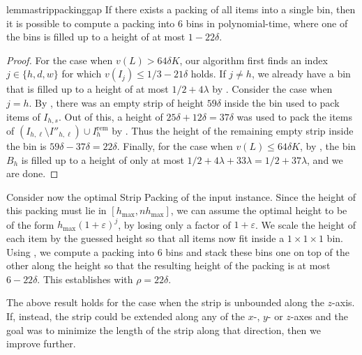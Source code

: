 \documentclass[a4paper,UKenglish,cleveref, autoref, thm-restate]{lipics-v2021}
\renewcommand{\epsilon}{\lambda}
\begin{document}
\begin{restatable}{lemma}{strippackinggap}
\label{lem:strippackinggap}
    If there exists a packing of all items into a single bin, then it is possible to compute a packing into 6 bins in polynomial-time, where one of the bins is filled up to a height of at most $1-22\delta$.
\end{restatable}
\begin{proof}
    For the case when $v(L)>64\delta K$, our algorithm first finds an index $j \in \{h,d,w\}$ for which $v(I_j)\le 1/3-21\delta$ holds. If $j\neq h$, we already have a bin that is filled up to a height of at most $1/2+4\epsilon$ by . Consider the case when $j=h$. By , there was an empty strip of height $59\delta$ inside the bin used to pack items of $I_{h,s}$. Out of this, a height of $25\delta + 12\delta = 37\delta$ was used to pack the items of $(I_{h,\ell}\setminus I''_{h,\ell})\cup I^{\text{rem}}_h$ by . Thus the height of the remaining empty strip inside the bin is $59\delta - 37\delta = 22\delta$. Finally, for the case when $v(L)\le 64\delta K$, by , the bin $B_h$ is filled up to a height of only at most $1/2+4\epsilon + 33\epsilon = 1/2+37\epsilon$, and we are done.
\end{proof}

Consider now the optimal Strip Packing of the input instance. Since the height of this packing must lie in $[h_{\text{max}},nh_{\text{max}}]$, we can assume the optimal height to be of the form $h_{\text{max}}(1+\varepsilon)^j$, by losing only a factor of $1+\varepsilon$. We scale the height of each item by the guessed height so that all items now fit inside a $1\times 1\times 1$ bin. Using , we compute a packing into 6 bins and stack these bins one on top of the other along the height so that the resulting height of the packing is at most $6-22\delta$. This establishes  with $\rho = 22\delta$.

The above result holds for the case when the strip is unbounded along the $z$-axis. If, instead, the strip could be extended along any of the $x$-, $y$- or $z$-axes and the goal was to minimize the length of the strip along that direction, then we improve further.
\end{document}
